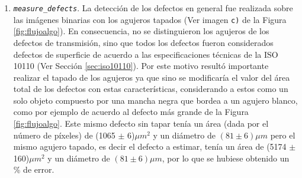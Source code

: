 \begin{enumerate}
\item \texttt{\textit{measure\_defects}}. La detección de los defectos en general fue realizada sobre las imágenes binarias con los agujeros tapados (Ver imagen \texttt{c)} de la Figura \ref{fig:flujoalgo}). En consecuencia, no se distinguieron los agujeros de los defectos de transmisión, sino que todos los defectos fueron considerados defectos de superficie de acuerdo a las especificaciones técnicas de la ISO 10110 (Ver Sección \ref{sec:iso10110}). Por este motivo resultó importante realizar el tapado de los agujeros ya que sino se modificaría el valor del área total de los defectos con estas características, considerando a estos como un solo objeto compuesto por una mancha negra que bordea a un agujero blanco, como por ejemplo de acuerdo al defecto más grande de la Figura \ref{fig:flujoalgo}. Este mismo defecto sin tapar tenía un área (dada por el número de píxeles) de (1065 $\pm$ 6)$\mu m^{2}$ y un diámetro de $(81 \pm 6)\mu m$ pero el mismo agujero tapado, es decir el defecto a estimar, tenía un área de (5174 $\pm$ 160)$\mu m^{2}$ y un diámetro de $(81 \pm 6)\mu m$, por lo que se hubiese obtenido un \% de error.


\end{enumerate}
